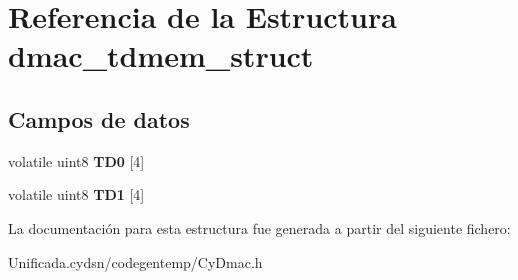 \hypertarget{structdmac__tdmem__struct}{}\section{Referencia de la Estructura dmac\+\_\+tdmem\+\_\+struct}
\label{structdmac__tdmem__struct}
\subsection*{Campos de datos}
\begin{DoxyCompactItemize}
\item 
\mbox{\label{structdmac__tdmem__struct_ab82570c068125d1f7ba5868475639852}} 
volatile uint8 {\bfseries T\+D0} \mbox{[}4\mbox{]}
\item 
\mbox{\label{structdmac__tdmem__struct_a6f06e8a584623c7a4396e4ae2a3072fd}} 
volatile uint8 {\bfseries T\+D1} \mbox{[}4\mbox{]}
\end{DoxyCompactItemize}


La documentación para esta estructura fue generada a partir del siguiente fichero\+:\begin{DoxyCompactItemize}
\item 
Unificada.\+cydsn/codegentemp/Cy\+Dmac.\+h\end{DoxyCompactItemize}
